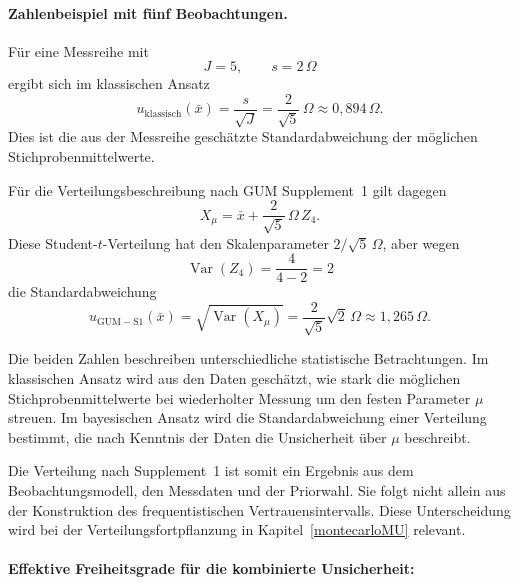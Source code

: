 \paragraph{Zahlenbeispiel mit fünf Beobachtungen.}

Für eine Messreihe mit
\begin{equation}
J=5,
\qquad
s=2\,\Omega
\end{equation}
ergibt sich im klassischen Ansatz
\begin{equation}
u_{\mathrm{klassisch}}(\bar x)
=
\frac{s}{\sqrt J}
=
\frac{2}{\sqrt5}\,\Omega
\approx0{,}894\,\Omega.
\end{equation}
Dies ist die aus der Messreihe geschätzte Standardabweichung
der möglichen Stichprobenmittelwerte.

Für die Verteilungsbeschreibung nach GUM Supplement~1 gilt dagegen
\begin{equation}
X_\mu=\bar x+\frac{2}{\sqrt5}\,\Omega\,Z_4.
\end{equation}
Diese Student-$t$-Verteilung hat den Skalenparameter
$2/\sqrt5\,\Omega$, aber wegen
\begin{equation}
\operatorname{Var}(Z_4)=\frac{4}{4-2}=2
\end{equation}
die Standardabweichung
\begin{equation}
u_{\mathrm{GUM-S1}}(\bar x)
=
\sqrt{\operatorname{Var}(X_\mu)}
=
\frac{2}{\sqrt5}\sqrt2\,\Omega
\approx1{,}265\,\Omega.
\end{equation}

Die beiden Zahlen beschreiben unterschiedliche statistische
Betrachtungen. Im klassischen Ansatz wird aus den Daten
geschätzt, wie stark die möglichen Stichprobenmittelwerte
bei wiederholter Messung um den festen Parameter $\mu$ streuen.
Im bayesischen Ansatz wird die Standardabweichung einer Verteilung
bestimmt, die nach Kenntnis der Daten die Unsicherheit über
$\mu$ beschreibt.

Die Verteilung nach Supplement~1 ist somit ein Ergebnis
aus dem Beobachtungsmodell, den Messdaten und der Priorwahl.
Sie folgt nicht allein aus der Konstruktion des frequentistischen
Vertrauensintervalls. Diese Unterscheidung wird bei der
Verteilungsfortpflanzung in Kapitel~\ref{montecarloMU} relevant.

\paragraph{Effektive Freiheitsgrade für die kombinierte Unsicherheit:}

